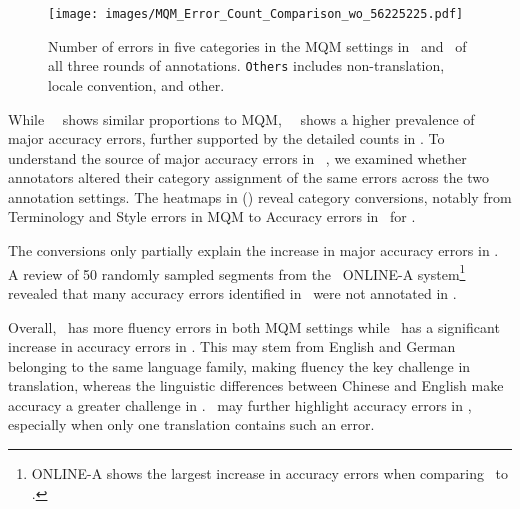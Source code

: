 \begin{figure*}
    \centering
    \texttt{[image: images/MQM\_Error\_Count\_Comparison\_wo\_56225225.pdf]}
    \caption{Number of errors in five categories in the MQM settings in \ZhEn~and \EnDe~of all three rounds of annotations. \texttt{Others} includes non-translation, locale convention, and other.
    }
    \label{fig:error_count}
    \vspace{-10pt}
\end{figure*}

While \EnDe~\sxsmqm~shows similar proportions to MQM, \ZhEn~\sxsmqm~shows a higher prevalence of major accuracy errors, further supported by the detailed counts in . To understand the source of major accuracy errors in \ZhEn~\sxsmqm, we examined whether annotators altered their category assignment of the same errors across the two annotation settings. The heatmaps in  () reveal category conversions, notably from Terminology and Style errors in MQM to Accuracy errors in \sxsmqm~for \ZhEn.

The conversions only partially explain the increase in major accuracy errors in \ZhEn. A review of 50 randomly sampled segments from the \ZhEn~ONLINE-A system\footnote{ONLINE-A shows the largest increase in accuracy errors when comparing \sxsmqm~to \psxsmqm.} revealed that many accuracy errors identified in \sxsmqm~were not annotated in \psxsmqm.

Overall, \EnDe~has more fluency errors in both MQM settings while \ZhEn~has a significant increase in accuracy errors in \sxsmqm. This may stem from English and German belonging to the same language family, making fluency the key challenge in translation, whereas the linguistic differences between Chinese and English make accuracy a greater challenge in \ZhEn. \sxsmqm~may further highlight accuracy errors in \ZhEn, especially when only one translation contains such an error.




